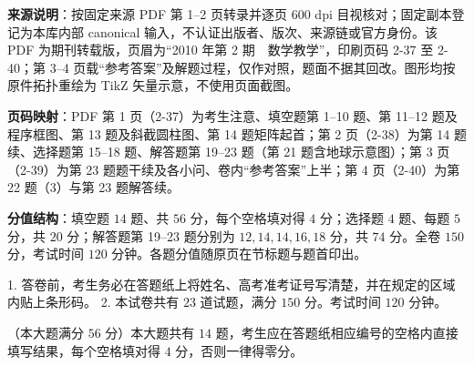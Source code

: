 

\begin{gktip}
\textbf{来源说明}：按固定来源 PDF 第 1–2 页转录并逐页 600 dpi 目视核对；固定副本登记为本库内部 canonical 输入，不认证出版者、版次、来源链或官方身份。该 PDF 为期刊转载版，页眉为“2010 年第 2 期　数学教学”，印刷页码 2-37 至 2-40；第 3–4 页载“参考答案”及解题过程，仅作对照，题面不据其回改。图形均按原件拓扑重绘为 TikZ 矢量示意，不使用页面截图。

\textbf{页码映射}：PDF 第 1 页（2-37）为考生注意、填空题第 1–10 题、第 11–12 题及程序框图、第 13 题及斜截圆柱图、第 14 题矩阵起首；第 2 页（2-38）为第 14 题续、选择题第 15–18 题、解答题第 19–23 题（第 21 题含地球示意图）；第 3 页（2-39）为第 23 题题干续及各小问、卷内“参考答案”上半；第 4 页（2-40）为第 22 题（3）与第 23 题解答续。

\textbf{分值结构}：填空题 $14$ 题、共 $56$ 分，每个空格填对得 $4$ 分；选择题 $4$ 题、每题 $5$ 分，共 $20$ 分；解答题第 19–23 题分别为 $12,14,14,16,18$ 分，共 $74$ 分。全卷 $150$ 分，考试时间 $120$ 分钟。各题分值随原页在节标题与题首印出。
\end{gktip}


1. 答卷前，考生务必在答题纸上将姓名、高考准考证号写清楚，并在规定的区域内贴上条形码。
2. 本试卷共有 $23$ 道试题，满分 $150$ 分。考试时间 $120$ 分钟。


（本大题满分 $56$ 分）本大题共有 $14$ 题，考生应在答题纸相应编号的空格内直接填写结果，每个空格填对得 $4$ 分，否则一律得零分。

